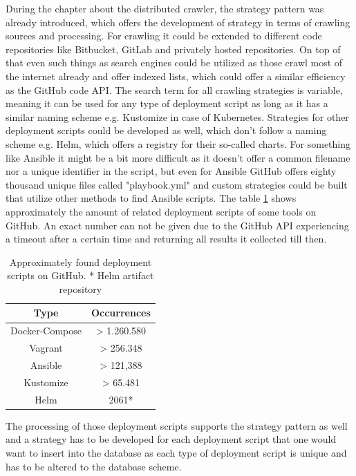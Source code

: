 During the chapter about the distributed crawler, the strategy pattern was already introduced, which offers the development of strategy in terms of crawling sources and processing.
For crawling it could be extended to different code repositories like Bitbucket, GitLab and privately hosted repositories. On top of that even such things as search engines could be utilized as those crawl most of the internet already and offer indexed lists, which could offer a similar efficiency as the GitHub code API. The search term for all crawling strategies is variable, meaning it can be used for any type of deployment script as long as it has a similar naming scheme e.g. Kustomize in case of Kubernetes. Strategies for other deployment scripts could be developed as well, which don't follow a naming scheme e.g. Helm, which offers a registry for their so-called charts. For something like Ansible it might be a bit more difficult as it doesn't offer a common filename nor a unique identifier in the script, but even for Ansible GitHub offers eighty thousand unique files called "playbook.yml" and custom strategies could be built that utilize other methods to find Ansible scripts. The table \ref{deployment_script_occurrences} shows approximately the amount of related deployment scripts of some tools on GitHub. An exact number can not be given due to the GitHub API experiencing a timeout after a certain time and returning all results it collected till then.

\begin{table}[h!]
    \centering
    \begin{tabular}{ |c|c| }
    \hline
    Type & Occurrences \\
    \hline
         Docker-Compose & > 1.260.580 \\
         Vagrant & > 256.348\\
         Ansible & > 121,388\\
         Kustomize & > 65.481\\
         Helm & 2061*\\
    \hline
    \end{tabular}
    \caption{Approximately found deployment scripts on GitHub. * Helm artifact repository}
    \label{deployment_script_occurrences}
\end{table}

The processing of those deployment scripts supports the strategy pattern as well and a strategy has to be developed for each deployment script that one would want to insert into the database as each type of deployment script is unique and has to be altered to the database scheme.

